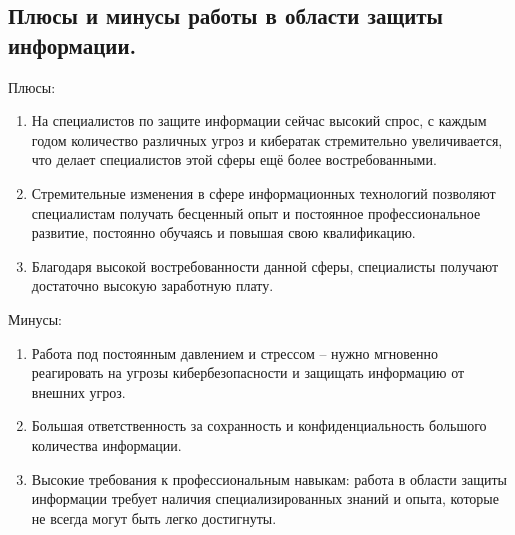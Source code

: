 \subsection{Плюсы и минусы работы в области защиты информации.}
Плюсы:
\begin{enumerate}
    \item На специалистов по защите информации сейчас высокий спрос, с каждым годом количество различных угроз и кибератак 
    стремительно увеличивается, что делает специалистов этой сферы ещё более востребованными.
    \item Стремительные изменения в сфере информационных технологий позволяют специалистам получать бесценный опыт и 
    постоянное профессиональное развитие, постоянно обучаясь и повышая свою квалификацию.
    \item Благодаря высокой востребованности данной сферы, специалисты получают достаточно высокую заработную плату.
\end{enumerate}
 
Минусы:
\begin{enumerate}
    \item Работа под постоянным давлением и стрессом – нужно мгновенно реагировать на угрозы кибербезопасности и защищать 
    информацию от внешних угроз.
    \item Большая ответственность за сохранность и конфиденциальность большого количества информации.
    \item Высокие требования к профессиональным навыкам: работа в области защиты информации требует наличия 
    специализированных знаний и опыта, которые не всегда могут быть легко достигнуты.
\end{enumerate}